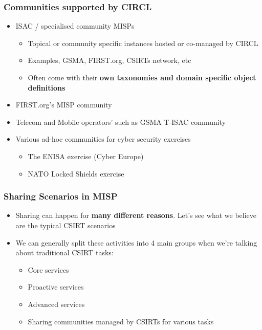 \begin{frame}
\frametitle{Communities supported by CIRCL}
\begin{itemize}
        \item ISAC / specialised community MISPs
        \begin{itemize}
            \item Topical or community specific instances hosted or co-managed by CIRCL
            \item Examples, GSMA, FIRST.org, CSIRTs network, etc
            \item Often come with their {\bf own taxonomies and domain specific object definitions}
        \end{itemize}
	\item FIRST.org's MISP community
	\item Telecom and Mobile operators' such as GSMA T-ISAC community
	\item Various ad-hoc communities for cyber security exercises 
	\begin{itemize}
        \item The ENISA exercise (Cyber Europe) 
        \item NATO Locked Shields exercise
	\end{itemize}
\end{itemize}
\end{frame}

\begin{frame}
\frametitle{Sharing Scenarios in MISP}
\begin{itemize}
	\item Sharing can happen for {\bf many different reasons}. Let's see what we believe are the typical CSIRT scenarios
        \item We can generally split these activities into 4 main groups when we're talking about traditional CSIRT tasks:
	\begin{itemize}
		\item Core services
		\item Proactive services
		\item Advanced services
		\item Sharing communities managed by CSIRTs for various tasks
	\end{itemize}
\end{itemize}
\end{frame}

